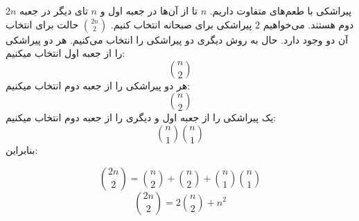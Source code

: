 $2n$
پیراشکی با طعم‌های متفاوت داریم.
$n$
تا از آن‌ها در جعبه اول و 
$n$
تای دیگر در جعبه دوم هستند. می‌خواهیم 
$2$
پیراشکی برای صبحانه انتخاب کنیم.
	\p
$\binom{2n}{2}$
حالت برای انتخاب آن دو وجود دارد.
	\p
حال به روش دیگری دو پیراشکی را انتخاب می‌کنیم.
هر دو پیراشکی را از جعبه اول انتخاب میکنیم:
$$\binom{n}{2}$$
هر دو پیراشکی را از جعبه دوم انتخاب میکنیم:
$$\binom{n}{2}$$
یک پیراشکی را از جعبه اول و دیگری را از جعبه دوم انتخاب میکنیم:
$$\binom{n}{1}\binom{n}{1}$$
بنابراین:

$$\binom{2n}{2} = \binom{n}{2} + \binom{n}{2} + \binom{n}{1}\binom{n}{1}$$
$$\binom{2n}{2} = 2\binom{n}{2} + n^2$$